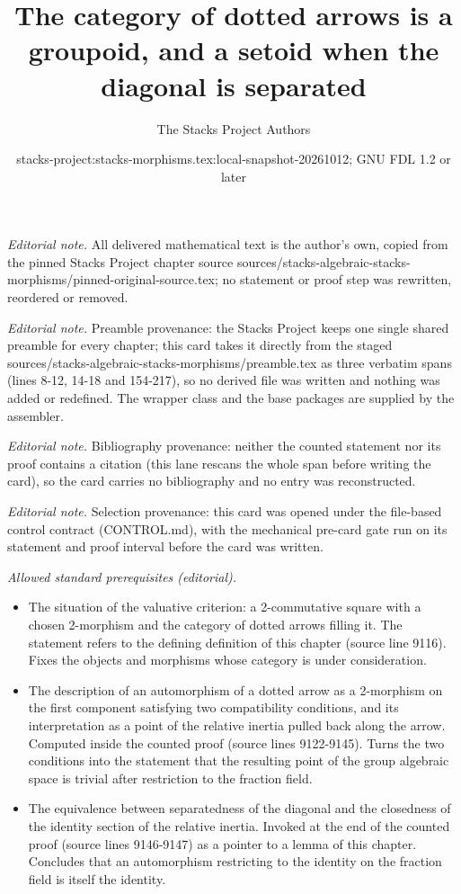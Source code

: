 \documentclass[10pt,a4paper]{amsart}
\title{The category of dotted arrows is a groupoid, and a setoid when the diagonal is separated}
\author{The Stacks Project Authors}
\date{stacks-project:stacks-morphisms.tex:local-snapshot-20261012; GNU FDL 1.2 or later}
\theoremstyle{plain}
\theoremstyle{definition}
\theoremstyle{remark}
\numberwithin{equation}{subsection}
\begin{document}
\maketitle
\noindent\textit{Editorial note.} All delivered mathematical text is the author's own, copied from the pinned Stacks Project chapter source sources/stacks-algebraic-stacks-morphisms/pinned-original-source.tex; no statement or proof step was rewritten, reordered or removed.\par\medskip
\noindent\textit{Editorial note.} Preamble provenance: the Stacks Project keeps one single shared preamble for every chapter; this card takes it directly from the staged sources/stacks-algebraic-stacks-morphisms/preamble.tex as three verbatim spans (lines 8-12, 14-18 and 154-217), so no derived file was written and nothing was added or redefined. The wrapper class and the base packages are supplied by the assembler.\par\medskip
\noindent\textit{Editorial note.} Bibliography provenance: neither the counted statement nor its proof contains a citation (this lane rescans the whole span before writing the card), so the card carries no bibliography and no entry was reconstructed.\par\medskip
\noindent\textit{Editorial note.} Selection provenance: this card was opened under the file-based control contract (CONTROL.md), with the mechanical pre-card gate run on its statement and proof interval before the card was written.\par\medskip
\noindent\textit{Allowed standard prerequisites (editorial).}\begin{itemize}
\item The situation of the valuative criterion: a 2-commutative square with a chosen 2-morphism and the category of dotted arrows filling it. The statement refers to the defining definition of this chapter (source line 9116). Fixes the objects and morphisms whose category is under consideration.
\item The description of an automorphism of a dotted arrow as a 2-morphism on the first component satisfying two compatibility conditions, and its interpretation as a point of the relative inertia pulled back along the arrow. Computed inside the counted proof (source lines 9122-9145). Turns the two conditions into the statement that the resulting point of the group algebraic space is trivial after restriction to the fraction field.
\item The equivalence between separatedness of the diagonal and the closedness of the identity section of the relative inertia. Invoked at the end of the counted proof (source lines 9146-9147) as a pointer to a lemma of this chapter. Concludes that an automorphism restricting to the identity on the fraction field is itself the identity.
\end{itemize}\medskip
\end{document}
